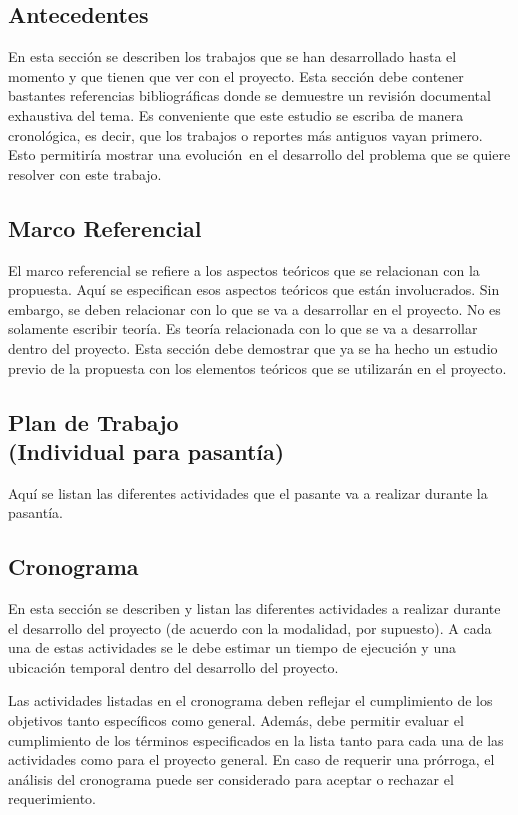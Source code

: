 \documentclass{article}
\begin{document}
\subsection*{Antecedentes}
\noindent En esta sección se describen los trabajos que se han desarrollado hasta el momento y que tienen que ver con el proyecto. Esta sección debe contener bastantes referencias bibliográficas donde se demuestre un revisión documental exhaustiva del tema. Es conveniente que este estudio se escriba de manera cronológica, es decir, que los trabajos o reportes más antiguos vayan primero. Esto permitiría mostrar una \guillemotleft evolución\guillemotright\ en el desarrollo del problema que se quiere resolver con este trabajo.

\subsection*{Marco Referencial}
\noindent El marco referencial se refiere a los aspectos teóricos que se relacionan con la propuesta. Aquí se especifican esos aspectos teóricos que están involucrados. Sin embargo, se deben relacionar con lo que se va a desarrollar en el proyecto. No es solamente escribir teoría. Es teoría relacionada con lo que se va a desarrollar dentro del proyecto. Esta sección debe demostrar que ya se ha hecho un estudio previo de la propuesta con los elementos teóricos que se utilizarán en el proyecto. 

\subsection*{Plan de Trabajo \\ {\scriptsize (Individual para pasantía)}}
\noindent Aquí se listan las diferentes actividades que el pasante va a realizar durante la pasantía.

\subsection*{Cronograma}
\noindent En esta sección se describen y listan las diferentes actividades a realizar durante el desarrollo del proyecto (de acuerdo con la modalidad, por supuesto). A cada una de estas actividades se le debe estimar un tiempo de ejecución y una ubicación temporal dentro del desarrollo del proyecto.

Las actividades listadas en el cronograma deben reflejar el cumplimiento de los objetivos tanto específicos como general. Además, debe permitir evaluar el cumplimiento de los términos especificados en la lista tanto para cada una de las actividades como para el proyecto general. En caso de requerir una prórroga, el análisis del cronograma puede ser considerado para aceptar o rechazar el requerimiento.
\end{document}
